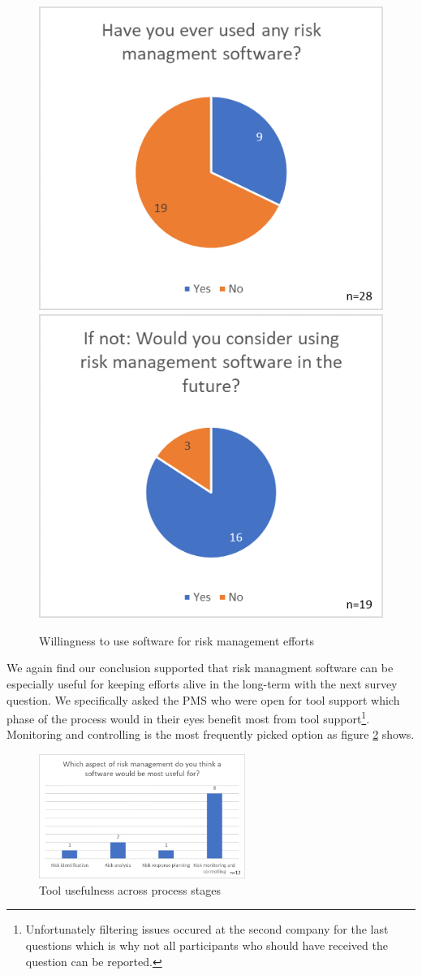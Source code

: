 \begin{figure}[H]
	\centering
	\includegraphics[width=.45\textwidth]{Assets/survey_results/Q5.png}
	\includegraphics[width=.45\textwidth]{Assets/survey_results/Q6.png}
	\caption{Willingness to use software for risk management efforts}
	\label{fig:label24}
\end{figure}

We again find our conclusion supported that risk managment software can be especially useful for keeping efforts alive in the long-term with the next survey question. We specifically asked the PMS who were open for tool support which phase of the process would in their eyes benefit most from tool support\footnote{Unfortunately filtering issues occured at the second company for the last questions which is why not all participants who should have received the question can be reported.}. Monitoring and controlling is the most frequently picked option as figure \ref{fig:label25} shows. 

\begin{figure}[H]
	\centering
	\includegraphics[width=0.6\textwidth]{Assets/survey_results/Q8.png}
	\caption{Tool usefulness across process stages}
	\label{fig:label25}
\end{figure}

